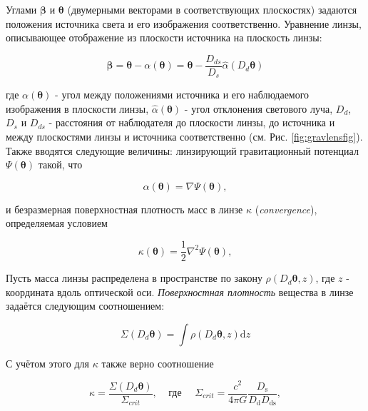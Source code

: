 Углами $\boldsymbol{\beta}$ и $\boldsymbol{\theta}$ (двумерными векторами в соответствующих плоскостях) задаются положения источника света и его изображения соответственно. Уравнение линзы, описывающее отображение из плоскости источника на плоскость линзы:

\begin{equation}\label{eq:lenseq}
\boldsymbol{\beta} = \boldsymbol{\theta} -  {\alpha}(\boldsymbol{\theta}) = \boldsymbol{\theta} - \frac{D_{ds}}{D_s} \hat{\alpha}(D_d\boldsymbol{\theta})
\end{equation}

\noindent где $\alpha(\boldsymbol{\theta})$ - угол между положениями источника и его наблюдаемого изображения в плоскости линзы, $\hat{\alpha}(\boldsymbol{\theta})$ - угол отклонения светового луча, $D_d$, $D_s$ и $D_{ds}$ - расстояния от наблюдателя до плоскости линзы, до источника и между плоскостями линзы и источника соответственно (см. Рис. \ref{fig:gravlensfig}). Также вводятся следующие величины: линзирующий гравитационный потенциал $\Psi(\boldsymbol{\theta})$ такой, что

\begin{equation}\label{eq:nablapsi}
\alpha(\boldsymbol{\theta}) = \nabla \Psi(\boldsymbol{\theta}),
\end{equation}

\noindent и безразмерная поверхностная плотность масс в линзе $\kappa$ (\textit{convergence}), определяемая условием

\begin{equation}\label{eq:nabla2psi}
\kappa({\boldsymbol{\theta}}) = \frac{1}{2}\nabla^2 \Psi(\boldsymbol{\theta}),
\end{equation}

Пусть масса линзы распределена в пространстве по закону $\rho(D_d \boldsymbol{\theta}, z)$, где $z$ - координата вдоль оптической оси. \textit{Поверхностная плотность} вещества в линзе задаётся следующим соотношением:

\begin{equation}\label{eq:sigmasurf}
\Sigma(D_d \boldsymbol{\theta})=\int \rho(D_d \boldsymbol{\theta}, z) \mathrm{d} z
\end{equation}

С учётом этого для $\kappa$ также верно соотношение

\begin{equation}\label{eq:convergence}
\kappa = \frac{\Sigma(D_d \boldsymbol{\theta})}{\Sigma_{crit}}, \ \ \ \ \  \textrm{где} \ \ \ \ \ \ \Sigma_{crit}=\frac{c^{2}}{4 \pi G} \frac{D_{\mathrm{s}}}{D_{\mathrm{d}} D_{\mathrm{ds}}},
\end{equation}

